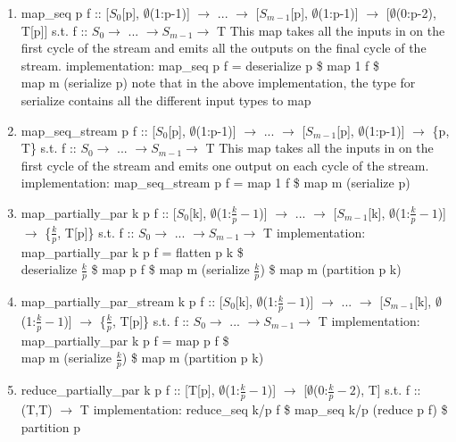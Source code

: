 \documentclass[11pt,fleqn]{article}
\numberwithin{equation}{subsection}
\begin{document}
\begin{enumerate}
    \item map\_seq p f :: [$S_0$[p], $\emptyset$(1:p-1)] $\rightarrow$ ...
        $\rightarrow$ [$S_{m-1}$[p], $\emptyset$(1:p-1)] $\rightarrow$
        [$\emptyset$(0:p-2), T[p]]
        \subitem s.t. f :: $S_0 \rightarrow$ ... $\rightarrow S_{m-1} \rightarrow$ T
        \subitem This map takes all the inputs in on the first cycle of the 
        stream and emits all the outputs on the final cycle of the stream.
        \subitem implementation: map\_seq p f = deserialize p \$ map 1 f \$ \\ map m (serialize p)
        \subitem note that in the above implementation, the type for serialize 
        contains all the different input types to map
    \item map\_seq\_stream p f :: [$S_0$[p], $\emptyset$(1:p-1)] $\rightarrow$ ...
        $\rightarrow$ [$S_{m-1}$[p], $\emptyset$(1:p-1)] $\rightarrow$
        \{p, T\}
        \subitem s.t. f :: $S_0 \rightarrow$ ... $\rightarrow S_{m-1} \rightarrow$ T
        \subitem This map takes all the inputs in on the first cycle of the 
        stream and emits one output on each cycle of the stream.
        \subitem implementation: map\_seq\_stream p f = map 1 f \$ map m (serialize p)
    \item map\_partially\_par k p f :: [$S_0$[k], $\emptyset$(1:$\frac{k}{p}-1$)] 
        $\rightarrow$ ... $\rightarrow$ 
        [$S_{m-1}$[k], $\emptyset$(1:$\frac{k}{p}-1$)] $\rightarrow$
        \{$\frac{k}{p}$, T[p]\}
        \subitem s.t. f :: $S_0 \rightarrow$ ... $\rightarrow S_{m-1} \rightarrow$ T
        \subitem implementation: map\_partially\_par k p f = flatten p k \$ \\ 
        deserialize $\frac{k}{p}$ \$ map p f \$ map m (serialize $\frac{k}{p}$) \$ map m (partition p k)
    \item map\_partially\_par\_stream k p f :: [$S_0$[k], $\emptyset$(1:$\frac{k}{p}-1$)] 
        $\rightarrow$ ... $\rightarrow$ 
        [$S_{m-1}$[k], $\emptyset$(1:$\frac{k}{p}-1$)] $\rightarrow$
        \{$\frac{k}{p}$, T[p]\}
        \subitem s.t. f :: $S_0 \rightarrow$ ... $\rightarrow S_{m-1} \rightarrow$ T
        \subitem implementation: map\_partially\_par k p f = map p f \$ \\ 
        map m (serialize $\frac{k}{p}$) \$ map m (partition p k)
    \item reduce\_partially\_par k p f :: [T[p], $\emptyset$(1:$\frac{k}{p}-1$)] 
        $\rightarrow$ [$\emptyset$(0:$\frac{k}{p}-2$), T]
        \subitem s.t. f :: (T,T) $\rightarrow$ T
        \subitem implementation: reduce\_seq k/p f \$ map\_seq k/p (reduce p f) 
        \$ partition p
\end{enumerate}
\end{document}
